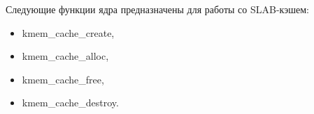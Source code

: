 
Следующие функции ядра предназначены для работы со SLAB-кэшем:
\begin{itemize}
    \item kmem\_cache\_create,
    \item kmem\_cache\_alloc,
    \item kmem\_cache\_free,
    \item kmem\_cache\_destroy.
\end{itemize}

